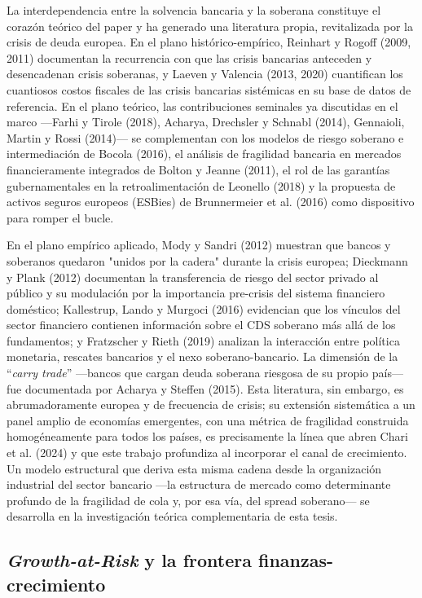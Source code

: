 \documentclass[5p,times,twocolumn,authoryear]{elsarticle}
\begin{document}
La interdependencia entre la solvencia bancaria y la soberana constituye el corazón teórico del paper y ha generado una literatura propia, revitalizada por la crisis de deuda europea. En el plano histórico-empírico, Reinhart y Rogoff (2009, 2011) documentan la recurrencia con que las crisis bancarias anteceden y desencadenan crisis soberanas, y Laeven y Valencia (2013, 2020) cuantifican los cuantiosos costos fiscales de las crisis bancarias sistémicas en su base de datos de referencia. En el plano teórico, las contribuciones seminales ya discutidas en el marco —Farhi y Tirole (2018), Acharya, Drechsler y Schnabl (2014), Gennaioli, Martin y Rossi (2014)— se complementan con los modelos de riesgo soberano e intermediación de Bocola (2016), el análisis de fragilidad bancaria en mercados financieramente integrados de Bolton y Jeanne (2011), el rol de las garantías gubernamentales en la retroalimentación de Leonello (2018) y la propuesta de activos seguros europeos (ESBies) de Brunnermeier et al. (2016) como dispositivo para romper el bucle.

En el plano empírico aplicado, Mody y Sandri (2012) muestran que bancos y soberanos quedaron "unidos por la cadera" durante la crisis europea; Dieckmann y Plank (2012) documentan la transferencia de riesgo del sector privado al público y su modulación por la importancia pre-crisis del sistema financiero doméstico; Kallestrup, Lando y Murgoci (2016) evidencian que los vínculos del sector financiero contienen información sobre el CDS soberano más allá de los fundamentos; y Fratzscher y Rieth (2019) analizan la interacción entre política monetaria, rescates bancarios y el nexo soberano-bancario. La dimensión de la ``\textit{carry trade}'' —bancos que cargan deuda soberana riesgosa de su propio país— fue documentada por Acharya y Steffen (2015). Esta literatura, sin embargo, es abrumadoramente europea y de frecuencia de crisis; su extensión sistemática a un panel amplio de economías emergentes, con una métrica de fragilidad construida homogéneamente para todos los países, es precisamente la línea que abren Chari et al. (2024) y que este trabajo profundiza al incorporar el canal de crecimiento. Un modelo estructural que deriva esta misma cadena desde la organización industrial del sector bancario —la estructura de mercado como determinante profundo de la fragilidad de cola y, por esa vía, del spread soberano— se desarrolla en la investigación teórica complementaria de esta tesis.

\subsection{\textit{Growth-at-Risk} y la frontera finanzas-crecimiento}
\end{document}
